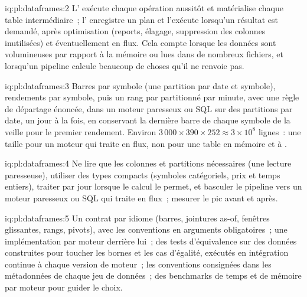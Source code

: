 \begin{solution}{iq:pl:dataframes:2}
L' exécute chaque opération aussitôt et matérialise chaque table intermédiaire~; l' enregistre un plan et l'exécute lorsqu'un
résultat est demandé, après optimisation (reports, élagage, suppression des colonnes inutilisées) et éventuellement en flux. Cela compte lorsque les données
sont volumineuses par rapport à la mémoire ou lues dans de nombreux fichiers, et lorsqu'un pipeline calcule beaucoup de choses qu'il ne renvoie pas.
\end{solution}

\begin{solution}{iq:pl:dataframes:3}
Barres par symbole (une partition par date et symbole), rendements par symbole, puis un rang par  partitionné par minute, avec une règle de départage énoncée, dans un
moteur paresseux ou SQL sur des partitions par date, un jour à la fois, en conservant la dernière barre de chaque symbole de la veille pour le premier rendement. Environ
$3\,000 \times 390 \times 252 \approx 3\times10^8$ lignes~: une taille pour un moteur qui traite en flux, non pour une table en mémoire et à .
\end{solution}

\begin{solution}{iq:pl:dataframes:4}
Ne lire que les colonnes et partitions nécessaires (une lecture paresseuse), utiliser des types compacts (symboles catégoriels, prix et temps entiers), traiter par
jour lorsque le calcul le permet, et basculer le pipeline vers un moteur paresseux ou SQL qui traite en flux~; mesurer le pic avant et après.
\end{solution}

\begin{solution}{iq:pl:dataframes:5}
Un contrat par idiome (barres, jointures as-of, fenêtres glissantes, rangs, pivots), avec les conventions en arguments obligatoires~; une implémentation par
moteur derrière lui~; des tests d'équivalence sur des données construites pour toucher les bornes et les cas d'égalité, exécutés en intégration continue à chaque version de moteur~; les
conventions consignées dans les métadonnées de chaque jeu de données~; des benchmarks de temps et de mémoire par moteur pour guider le choix.
\end{solution}
